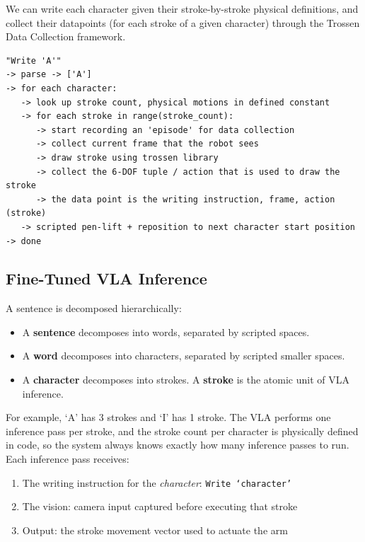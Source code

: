 \documentclass[12pt,a4paper]{article}
\begin{document}
We can write each character given their stroke-by-stroke physical definitions, and collect their datapoints (for each stroke of a given character) through the Trossen Data Collection framework.

\begin{verbatim}
"Write 'A'"
-> parse -> ['A']
-> for each character:
   -> look up stroke count, physical motions in defined constant
   -> for each stroke in range(stroke_count):
      -> start recording an 'episode' for data collection
      -> collect current frame that the robot sees
      -> draw stroke using trossen library
      -> collect the 6-DOF tuple / action that is used to draw the stroke
      -> the data point is the writing instruction, frame, action (stroke)
   -> scripted pen-lift + reposition to next character start position
-> done
\end{verbatim}


\subsection{Fine-Tuned VLA Inference}

A sentence is decomposed hierarchically:
\begin{itemize}
  \item A \textbf{sentence} decomposes into words, separated by scripted spaces.
  \item A \textbf{word} decomposes into characters, separated by scripted smaller spaces.
  \item A \textbf{character} decomposes into strokes. A \textbf{stroke} is the atomic unit of VLA inference.
\end{itemize}

For example, `A' has 3 strokes and `I' has 1 stroke. The VLA performs one inference pass per stroke, and the stroke count per character is physically defined in code, so the system always knows exactly how many inference passes to run. Each inference pass receives:
\begin{enumerate}
  \item The writing instruction for the \emph{character}: \texttt{Write `character'}
  \item The vision: camera input captured before executing that stroke
  \item Output: the stroke movement vector used to actuate the arm
\end{enumerate}
\end{document}
